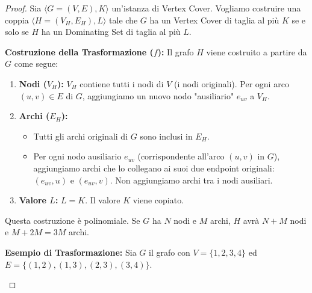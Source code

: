 \documentclass[a4paper]{article}
\theoremstyle{definition} %
\theoremstyle{definition} %
\begin{document}
\begin{proof}
Sia $\langle G=(V,E), K \rangle$ un'istanza di Vertex Cover. Vogliamo costruire una coppia $\langle H=(V_H, E_H), L \rangle$ tale che $G$ ha un Vertex Cover di taglia al più $K$ se e solo se $H$ ha un Dominating Set di taglia al più $L$.

\textbf{Costruzione della Trasformazione ($f$):}
Il grafo $H$ viene costruito a partire da $G$ come segue:
\begin{enumerate}
    \item \textbf{Nodi ($V_H$):} $V_H$ contiene tutti i nodi di $V$ (i nodi originali). Per ogni arco $(u, v) \in E$ di $G$, aggiungiamo un nuovo nodo "ausiliario" $e_{uv}$ a $V_H$.
    \item \textbf{Archi ($E_H$):}
    \begin{itemize}
        \item Tutti gli archi originali di $G$ sono inclusi in $E_H$.
        \item Per ogni nodo ausiliario $e_{uv}$ (corrispondente all'arco $(u,v)$ in $G$), aggiungiamo archi che lo collegano ai suoi due endpoint originali: $(e_{uv}, u)$ e $(e_{uv}, v)$. Non aggiungiamo archi tra i nodi ausiliari.
    \end{itemize}
    \item \textbf{Valore $L$:} $L = K$. Il valore $K$ viene copiato.
\end{enumerate}
Questa costruzione è polinomiale. Se $G$ ha $N$ nodi e $M$ archi, $H$ avrà $N+M$ nodi e $M + 2M = 3M$ archi.

\textbf{Esempio di Trasformazione:}
Sia $G$ il grafo con $V=\{1,2,3,4\}$ ed $E=\{(1,2), (1,3), (2,3), (3,4)\}$.
\begin{center}
\end{center}
\end{proof}
\end{document}
